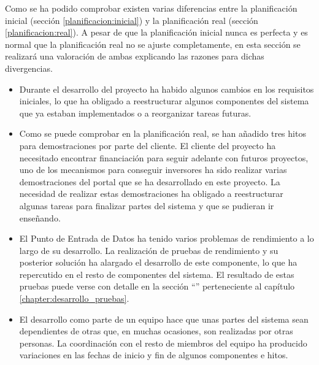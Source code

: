 Como se ha podido comprobar existen varias diferencias entre la planificación inicial (sección \ref{planificacion:inicial}) y la planificación real (sección \ref{planificacion:real}).  A pesar de que la planificación inicial nunca es perfecta y es normal que la planificación real no se ajuste completamente, en esta sección se realizará una valoración de ambas explicando las razones para dichas divergencias.

\begin{itemize}
	\item
		Durante el desarrollo del proyecto ha habido algunos cambios en los requisitos iniciales, lo que ha obligado a reestructurar algunos componentes del sistema que ya estaban implementados o a reorganizar tareas futuras.
	\item
		Como se puede comprobar en la planificación real, se han añadido tres hitos para demostraciones por parte del cliente.  El cliente del proyecto ha necesitado encontrar financiación para seguir adelante con futuros proyectos, uno de los mecanismos para conseguir inversores ha sido realizar varias demostraciones del portal que se ha desarrollado en este proyecto.  La necesidad de realizar estas demostraciones ha obligado a reestructurar algunas tareas para finalizar partes del sistema y que se pudieran ir enseñando.
	\item
		El Punto de Entrada de Datos ha tenido varios problemas de rendimiento a lo largo de su desarrollo.  La realización de pruebas de rendimiento y su posterior solución ha alargado el desarrollo de este componente, lo que ha repercutido en el resto de componentes del sistema.  El resultado de estas pruebas puede verse con detalle en la sección ``'' perteneciente al capítulo \ref{chapter:desarrollo_pruebas}.
	\item
		El desarrollo como parte de un equipo hace que unas partes del sistema sean dependientes de otras que, en muchas ocasiones, son realizadas por otras personas.  La coordinación con el resto de miembros del equipo ha producido variaciones en las fechas de inicio y fin de algunos componentes e hitos.
\end{itemize}